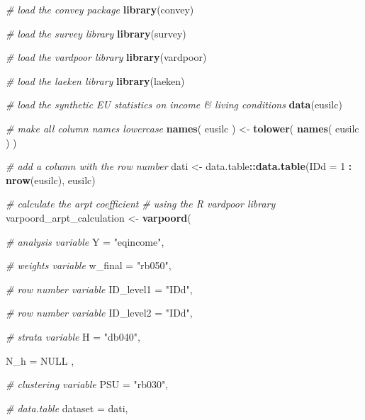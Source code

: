 \documentclass[]{book}
\newenvironment{Shaded}{\begin{snugshade}}{\end{snugshade}}
\newcommand{\CommentTok}[1]{\textcolor[rgb]{0.56,0.35,0.01}{\textit{#1}}}
\newcommand{\DataTypeTok}[1]{\textcolor[rgb]{0.13,0.29,0.53}{#1}}
\newcommand{\DecValTok}[1]{\textcolor[rgb]{0.00,0.00,0.81}{#1}}
\newcommand{\KeywordTok}[1]{\textcolor[rgb]{0.13,0.29,0.53}{\textbf{#1}}}
\newcommand{\NormalTok}[1]{#1}
\newcommand{\OperatorTok}[1]{\textcolor[rgb]{0.81,0.36,0.00}{\textbf{#1}}}
\newcommand{\OtherTok}[1]{\textcolor[rgb]{0.56,0.35,0.01}{#1}}
\newcommand{\StringTok}[1]{\textcolor[rgb]{0.31,0.60,0.02}{#1}}
\begin{document}
\begin{Shaded}
\begin{Highlighting}[]
\CommentTok{# load the convey package}
\KeywordTok{library}\NormalTok{(convey)}

\CommentTok{# load the survey library}
\KeywordTok{library}\NormalTok{(survey)}

\CommentTok{# load the vardpoor library}
\KeywordTok{library}\NormalTok{(vardpoor)}

\CommentTok{# load the laeken library}
\KeywordTok{library}\NormalTok{(laeken)}

\CommentTok{# load the synthetic EU statistics on income & living conditions}
\KeywordTok{data}\NormalTok{(eusilc)}

\CommentTok{# make all column names lowercase}
\KeywordTok{names}\NormalTok{( eusilc ) <-}\StringTok{ }\KeywordTok{tolower}\NormalTok{( }\KeywordTok{names}\NormalTok{( eusilc ) )}

\CommentTok{# add a column with the row number}
\NormalTok{dati <-}\StringTok{ }\NormalTok{data.table}\OperatorTok{::}\KeywordTok{data.table}\NormalTok{(}\DataTypeTok{IDd =} \DecValTok{1} \OperatorTok{:}\StringTok{ }\KeywordTok{nrow}\NormalTok{(eusilc), eusilc)}

\CommentTok{# calculate the arpt coefficient}
\CommentTok{# using the R vardpoor library}
\NormalTok{varpoord_arpt_calculation <-}
\StringTok{    }\KeywordTok{varpoord}\NormalTok{(}
    
        \CommentTok{# analysis variable}
        \DataTypeTok{Y =} \StringTok{"eqincome"}\NormalTok{, }
        
        \CommentTok{# weights variable}
        \DataTypeTok{w_final =} \StringTok{"rb050"}\NormalTok{,}
        
        \CommentTok{# row number variable}
        \DataTypeTok{ID_level1 =} \StringTok{"IDd"}\NormalTok{,}
        
        \CommentTok{# row number variable}
        \DataTypeTok{ID_level2 =} \StringTok{"IDd"}\NormalTok{,}
        
        \CommentTok{# strata variable}
        \DataTypeTok{H =} \StringTok{"db040"}\NormalTok{, }
        
        \DataTypeTok{N_h =} \OtherTok{NULL}\NormalTok{ ,}
        
        \CommentTok{# clustering variable}
        \DataTypeTok{PSU =} \StringTok{"rb030"}\NormalTok{, }
        
        \CommentTok{# data.table}
        \DataTypeTok{dataset =}\NormalTok{ dati, }
        

\end{Highlighting}
\end{Shaded}
\end{document}
